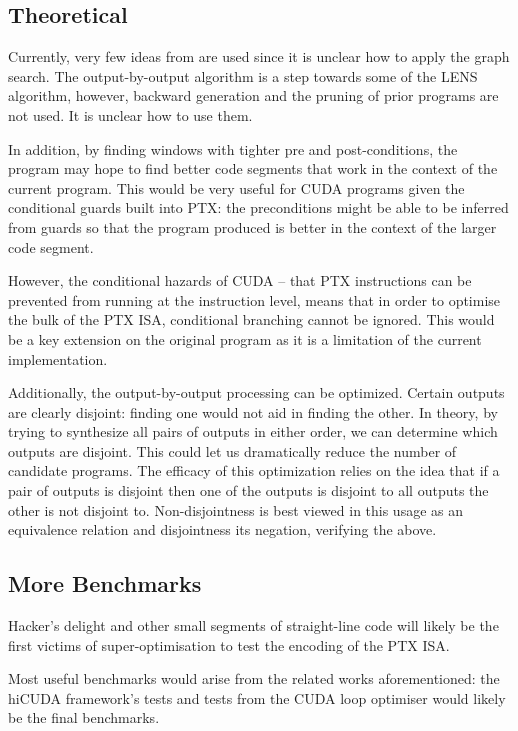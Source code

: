 \documentclass[letterpaper,twocolumn,10pt]{article}
\begin{document}
\subsection{Theoretical}

Currently, very few ideas from \cite{superopt} are used since it is
unclear how to apply the graph search. The output-by-output algorithm is
a step towards some of the LENS algorithm, however, backward generation
and the pruning of prior programs are not used. It is unclear how to use
them.

In addition, by finding windows with tighter pre and post-conditions,
the program may hope to find better code segments
that work in the context of the current program.
This would be very useful for CUDA programs given
the conditional guards built into PTX: the preconditions
might be able to be inferred from guards so that
the program produced is better in the context
of the larger code segment.

However, the conditional hazards of CUDA -- that
PTX instructions can be prevented from running
at the instruction level, means that in order to
optimise the bulk of the PTX ISA, conditional
branching cannot be ignored. This would be
a key extension on the original program as
it is a limitation of the current implementation.

Additionally, the output-by-output processing can be
optimized. Certain outputs are clearly disjoint: finding
one would not aid in finding the other. In theory, by
trying to synthesize all pairs of outputs in either order,
we can determine which outputs are disjoint. This could let
us dramatically reduce the number of candidate programs.
The efficacy of this optimization relies on the idea that
if a pair of outputs is disjoint then one of the outputs
is disjoint to all outputs the other is not disjoint to.
Non-disjointness is best viewed in this usage as an equivalence
relation and disjointness its negation, verifying the above.

\subsection{More Benchmarks}

Hacker's delight and other small segments of
straight-line code will likely be the first
victims of super-optimisation to test the
encoding of the PTX ISA.

Most useful benchmarks would arise from the related works aforementioned:
the hiCUDA \cite{hicuda} framework's tests and tests
from the CUDA loop optimiser \cite{CUDASynth} would likely
be the final benchmarks.
\end{document}
